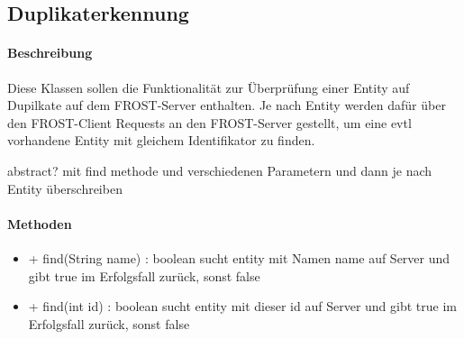 \subsection{Duplikaterkennung}

\paragraph{Beschreibung}
Diese Klassen sollen die Funktionalität zur Überprüfung einer Entity auf Dupilkate auf dem FROST-Server enthalten.
Je nach Entity werden dafür über den FROST-Client Requests an den FROST-Server gestellt, um eine evtl vorhandene Entity mit gleichem Identifikator zu finden.

abstract? mit find methode und verschiedenen Parametern und dann je nach Entity überschreiben

\paragraph{Methoden}

\begin{itemize}
\item + find(String name) : boolean
sucht entity mit Namen name auf Server und gibt true im Erfolgsfall zurück, sonst false
\item + find(int id) : boolean
sucht entity mit dieser id auf Server und gibt true im Erfolgsfall zurück, sonst false
\end{itemize}